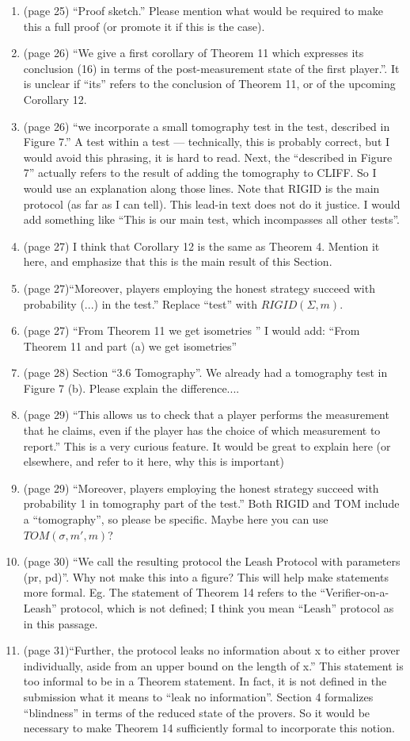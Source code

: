 \documentclass[12pt]{article}
\begin{document}
\begin{enumerate}
 \item (page 25) ``Proof sketch.'' Please mention what would be required to make this a full proof (or promote it if this is the case).
 \item (page 26) ``We give a first corollary of Theorem 11 which expresses its conclusion (16) in terms of the post-measurement
state of the first player.''. It is unclear if ``its'' refers to the conclusion of Theorem 11, or of the upcoming Corollary 12.
\item (page 26) ``we incorporate a
small tomography test in the test, described in Figure 7.'' A test within a test --- technically, this is probably correct, but I would avoid this phrasing, it is hard to read. Next, the ``described in Figure 7'' actually refers to the result of adding the tomography to CLIFF. So I would use an explanation along those lines. Note that RIGID is the main protocol (as far as I can tell). This lead-in text does not do it justice. I would add something like ``This is our main test, which incompasses all other tests''.
\item (page 27) I think that Corollary 12 is the same as Theorem 4. Mention it here, and emphasize that this is the main result of this Section.
\item (page 27)``Moreover, players employing the honest strategy succeed with probability (...) in the test.'' Replace ``test'' with $RIGID(\Sigma,m)$.
\item (page 27) ``From Theorem 11 we get isometries '' I would add: ``From Theorem 11 and part (a) we get isometries''
\item (page 28) Section ``3.6 Tomography''. We already had a tomography test in Figure 7 (b). Please explain the difference....
\item (page 29) ``This allows us
to check that a player performs the measurement that he claims, even if the player has the choice of which
measurement to report.'' This is a very curious feature. It would be great to explain here (or elsewhere, and refer to it here, why this is important)
\item (page 29) ``Moreover, players employing the honest strategy succeed with probability 1 in tomography part of the
test.'' Both RIGID and TOM include a ``tomography'', so please be specific. Maybe here you can use $TOM(\sigma,m',m)$?
\item (page 30) ``We call the resulting protocol the Leash Protocol with parameters (pr, pd)''. Why not make this into a figure? This will help make statements more formal. Eg. The statement of Theorem 14 refers to the ``Verifier-on-a-Leash'' protocol, which is not defined; I think you mean ``Leash'' protocol as in this passage.
    \item (page 31)``Further, the protocol leaks no information about x to either prover individually, aside from an upper bound
on the length of x.'' This statement is too informal to be in a Theorem statement. In fact, it is not defined in the submission what it means to ``leak no information''. Section 4 formalizes ``blindness'' in terms of the reduced state of the provers. So it would be necessary to make Theorem 14 sufficiently formal to incorporate this notion.


\end{enumerate}
\end{document}
